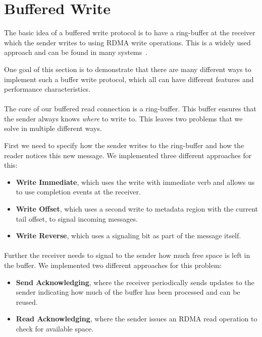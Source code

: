 \section{Buffered Write} \label{sec:conn:buf_write}

The basic idea of a buffered write protocol is to have a ring-buffer at the receiver which the sender writes to using
RDMA write operations. This is a widely used approach and can be found in many systems~\cite{herd, scal-rdma-rpc}.

One goal of this section is to demonstrate that there are many different ways to implement such a buffer write 
protocol, which all can have different features and performance characteristics.


\paragraph{}The core of our buffered read connection is a ring-buffer. This buffer ensures that the sender always knows 
\emph{where} to  write to. This leaves two problems that we solve in multiple different ways.

First we need to specify how the sender writes to the ring-buffer and how the reader notices this new message. We 
implemented three different approaches for this: 
\begin{itemize}
  \item \textbf{Write Immediate}, which uses the write with immediate verb and allows us to use completion 
    events at the receiver.
  \item \textbf{Write Offset}, which uses a second write to metadata region with the current tail offset,
    to signal incoming messages.
  \item \textbf{Write Reverse}, which uses a signaling bit as part of the message itself.
\end{itemize}
 

\paragraph{} Further the receiver needs to signal to the sender how much free space is left in the buffer. We implemented 
two different approaches for this problem:

\begin{itemize}
  \item \textbf{Send Acknowledging}, where the receiver periodically sends updates to the sender indicating how much of
    the buffer has been processed and can be reused.
  \item \textbf{Read Acknowledging}, where the sender issues an RDMA read operation to check for available space.
\end{itemize}

